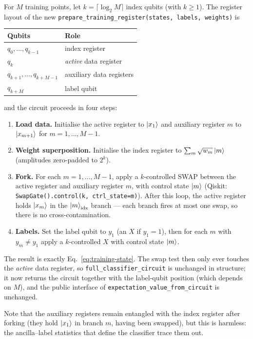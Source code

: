 \documentclass[11pt,a4paper]{article}
\begin{document}
For $M$ training points, let $k = \lceil \log_2 M \rceil$ index qubits
(with $k \geq 1$). The register layout of the new
\texttt{prepare\_training\_register(states, labels, weights)} is
\begin{center}
\begin{tabular}{ll}
  \toprule
  Qubits & Role \\
  \midrule
  $q_0, \dots, q_{k-1}$        & index register \\
  $q_k$                        & \emph{active} data register \\
  $q_{k+1}, \dots, q_{k+M-1}$  & auxiliary data registers \\
  $q_{k+M}$                    & label qubit \\
  \bottomrule
\end{tabular}
\end{center}
and the circuit proceeds in four steps:
\begin{enumerate}
  \item \textbf{Load data.} Initialise the active register to
        $\ket{x_1}$ and auxiliary register $m$ to $\ket{x_{m+1}}$ for
        $m = 1, \dots, M-1$.
  \item \textbf{Weight superposition.} Initialise the index register to
        $\sum_{m} \sqrt{w_m} \ket{m}$ (amplitudes zero-padded to $2^k$).
  \item \textbf{Fork.} For each $m = 1, \dots, M-1$, apply a
        $k$-controlled SWAP between the active register and auxiliary
        register $m$, with control state $\ket{m}$
        (Qiskit: \texttt{SwapGate().control(k, ctrl\_state=m)}). After
        this loop, the active register holds $\ket{x_m}$ in the
        $\ket{m}_{\text{idx}}$ branch --- each branch fires at most one
        swap, so there is no cross-contamination.
  \item \textbf{Labels.} Set the label qubit to $y_1$ (an $X$ if
        $y_1 = 1$), then for each $m$ with $y_m \neq y_1$ apply a
        $k$-controlled $X$ with control state $\ket{m}$.
\end{enumerate}
The result is exactly Eq.~\eqref{eq:training-state}. The swap test then
only ever touches the \emph{active} data register, so
\texttt{full\_classifier\_circuit} is unchanged in structure; it now
returns the circuit together with the label-qubit position (which depends
on $M$), and the public interface of
\texttt{expectation\_value\_from\_circuit} is unchanged.

Note that the auxiliary registers remain entangled with the index register
after forking (they hold $\ket{x_1}$ in branch $m$, having been swapped),
but this is harmless: the ancilla--label statistics that define the
classifier trace them out.
\end{document}
